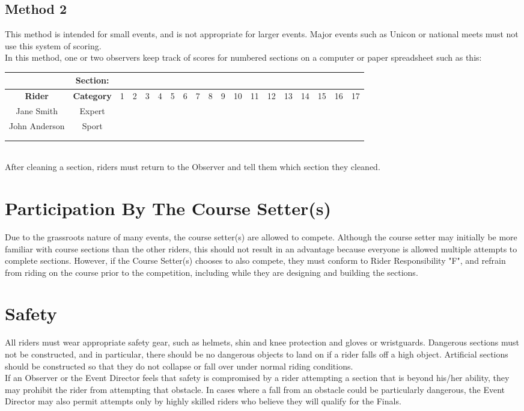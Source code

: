 \subsection{Method 2} 
This method is intended for small events, and is not appropriate for larger events. Major events such as Unicon or
national meets must not use this system of scoring.\\
In this method, one or two observers keep track of scores for numbered sections on a computer or paper spreadsheet
such as this:\\
\begin{tabular}{|c|c|c|c|c|c|c|c|c|c|c|c|c|c|c|c|c|c|c|}
\hline 
 & \textbf{Section:} & & &  & &  &  &  &  &  & & & &  &  &  &  &  \\ 
\hline 
\textbf{Rider} & \textbf{Category} & 1 & 2 & 3 & 4 & 5 & 6 & 7 & 8 & 9 & 10 & 11 & 12 & 13 & 14 & 15 & 16 & 17 \\ 
\hline 
Jane Smith & Expert &  &  &  &  &  &  &  & &  &  &  & &  &  & &  &  \\ 
\hline 
John Anderson & Sport &  &  & &  &  &  &  & &  &  &  &  &  &  &  &  & \\ 
\hline 
 & &  & & &  &  &  &  &  & & &  & &  & &  & &  \\ 
\hline 
 & &  & & &  &  &  &  &  & & &  & &  & &  & &  \\ 
\hline 
\end{tabular} \\
After cleaning a section, riders must return to the Observer and tell them which section they cleaned.
\section{Participation By The Course Setter(s)}
Due to the grassroots nature of many events, the course setter(s) are allowed to compete. Although the course setter may
initially be more familiar with course sections than the other riders, this should not result in an advantage because
everyone is allowed multiple attempts to complete sections. However, if the Course Setter(s) chooses to also compete, they
must conform to Rider Responsibility "F", and refrain from riding on the course prior to the competition, including while
they are designing and building the sections.
\section{Safety}
All riders must wear appropriate safety gear, such as helmets, shin and knee protection and gloves or wristguards.
Dangerous sections must not be constructed, and in particular, there should be no dangerous objects to land on if a rider
falls off a high object. Artificial sections should be constructed so that they do not collapse or fall over under normal riding
conditions.\\
If an Observer or the Event Director feels that safety is compromised by a rider attempting a section that is beyond his/her
ability, they may prohibit the rider from attempting that obstacle. In cases where a fall from an obstacle could be
particularly dangerous, the Event Director may also permit attempts only by highly skilled riders who believe they will
qualify for the Finals.
